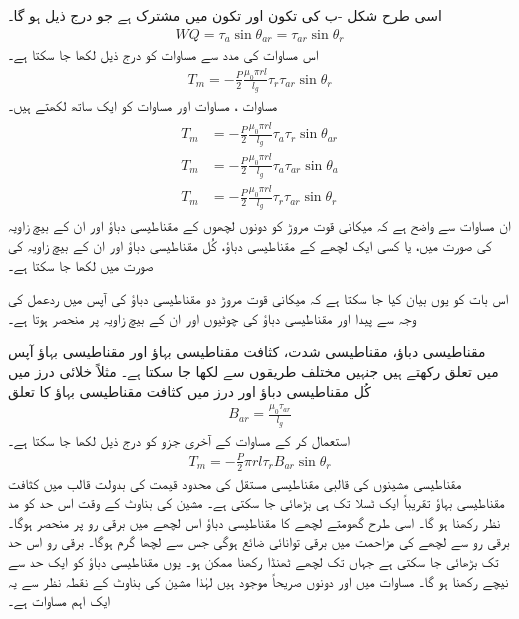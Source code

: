اسی طرح شکل -ب  کی تکون  اور تکون  میں   مشترک ہے جو درج ذیل ہو گا۔
\begin{align}
WQ=\tau_a \sin \theta_{ar}=\tau_{ar} \sin \theta_r
\end{align}
اس مساوات کی مدد سے مساوات   کو درج ذیل لکھا جا سکتا ہے۔
\begin{align}\label{مساوات_گھومتے_مشین_مروڑ_بذریعہ_کوتوانائی_پ}
T_m=-\frac{P}{2}\frac{\mu_0 \pi r l}{l_g} \tau_r \tau_{ar}  \sin \theta_r
\end{align}
مساوات ،  مساوات   اور مساوات   کو ایک ساتھ لکھتے ہیں۔
\begin{gather}
\begin{aligned}\label{مساوات_گھومتے_مشین_مروڑ_بذریعہ_کوتوانائی_ت}
T_m&=-\frac{P}{2}\frac{\mu_0 \pi r l}{l_g} \tau_a \tau_r \sin \theta_{ar}\\
T_m&=-\frac{P}{2}\frac{\mu_0 \pi r l}{l_g} \tau_a \tau_{ar}  \sin \theta_a\\
T_m&=-\frac{P}{2}\frac{\mu_0 \pi r l}{l_g} \tau_r \tau_{ar}  \sin \theta_r
\end{aligned}
\end{gather}
ان مساوات سے  واضح ہے کہ میکانی قوت مروڑ کو دونوں لچھوں کے مقناطیسی دباؤ اور ان کے بیچ زاویہ کی صورت میں،  یا کسی ایک لچھے کے مقناطیسی دباؤ، کُل مقناطیسی دباؤ اور ان کے بیچ زاویہ کی صورت میں لکھا جا سکتا ہے۔

اس بات کو یوں بیان کیا جا سکتا ہے کہ میکانی قوت مروڑ دو مقناطیسی دباؤ کی آپس میں ردعمل کی وجہ سے پیدا اور مقناطیسی دباؤ کی چوٹیوں اور ان کے بیچ زاویہ پر منحصر ہوتا ہے۔

مقناطیسی دباؤ، مقناطیسی شدت، کثافت مقناطیسی بہاؤ اور مقناطیسی بہاؤ  آپس میں تعلق رکھتے ہیں جنہیں مختلف طریقوں سے لکھا جا سکتا ہے۔ مثلاً خلائی درز میں کُل مقناطیسی دباؤ  اور  درز میں  کثافت مقناطیسی بہاؤ  کا تعلق
\begin{align}
B_{ar}=\frac{\mu_0 \tau_{ar}}{l_g}
\end{align}
استعمال کر کے مساوات   کے آخری جزو کو درج ذیل لکھا جا سکتا ہے۔
\begin{align}\label{مساوات_گھومنے_مووڑ_بناوٹی_حدیں}
T_m=-\frac{P}{2} \pi r l \tau_r B_{ar} \sin \theta_r
\end{align}
مقناطیسی مشینوں کی  قالبی مقناطیسی مستقل   کی محدود قیمت کی بدولت قالب میں کثافت مقناطیسی بہاؤ تقریباً ایک ٹسلا تک ہی بڑھائی جا سکتی ہے۔  مشین کی بناوٹ کے  وقت اس حد کو مد نظر رکھنا ہو گا۔ اسی طرح گھومتے لچھے کا مقناطیسی دباؤ اس لچھے میں برقی رو پر منحصر ہوگا۔  برقی رو سے لچھے کی مزاحمت میں برقی توانائی ضائع ہوگی  جس سے لچھا گرم ہوگا۔ برقی رو  اس حد تک بڑھائی جا سکتی ہے جہاں تک لچھے  ٹھنڈا رکھنا ممکن ہو۔ یوں مقناطیسی دباؤ کو ایک حد  سے نیچے رکھنا ہو گا۔ مساوات  میں   اور  دونوں صریحاً موجود ہیں لہٰذا مشین کی بناوٹ کے نقطہ نظر سے یہ ایک اہم مساوات ہے۔ 


